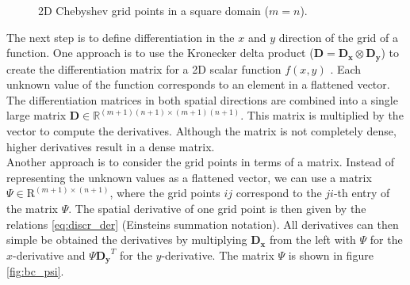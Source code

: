 \begin{figure}[h]
  \centering
  \caption{2D Chebyshev grid points in a square domain ($m = n$).}
  \label{fig:cheb_grid2d}
\end{figure}

The next step is to define differentiation in the $x$ and $y$ direction of the
grid of a function. One approach is to use the Kronecker delta product
($\mathbf{D} = \mathbf{D_x} \otimes \mathbf{D_y}$) to create the differentiation
matrix for a 2D scalar function $f(x,y)$ \citep{trefethen2000}. Each unknown
value of the function corresponds to an element in a flattened vector. The
differentiation matrices in both spatial directions are combined into a single
large matrix $\mathbf{D} \in \mathbb{R}^{(m+1)(n+1)\times(m+1)(n+1)}$. This
matrix is multiplied by the vector to compute the derivatives. Although the
matrix is not completely dense, higher derivatives result in a dense matrix. \\

Another approach is to consider the grid points in terms of a matrix. Instead
of representing the unknown values as a flattened vector, we can use a matrix
$\Psi \in \mathrm{R}^{(m+1) \times (n+1)}$, where the grid points $ij$
correspond to the $ji$-th entry of the matrix $\Psi$. The spatial derivative of
one grid point is then given by the relations \eqref{eq:discr_der} (Einsteins
summation notation). All derivatives can then simple be obtained the
derivatives by multiplying $\mathbf{D_x}$ from the left with $\Psi$ for the
$x$-derivative and $\Psi \mathbf{D_y}^T$ for the $y$-derivative. The matrix
$\Psi$ is shown in figure \ref{fig:bc_psi}.

